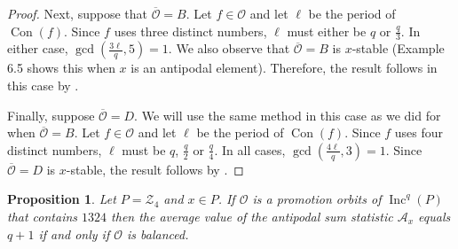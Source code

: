 \documentclass[11pt]{amsart}
\newtheorem{proposition}[theorem]{Proposition}
\theoremstyle{definition}
\newcommand{\as}{\mathcal{A}}
\DeclareMathOperator{\Inc}{\mathrm{Inc}}
\DeclareMathOperator{\Con}{\mathrm{Con}}
\newcommand{\calZ}{\mathcal{Z}}
\begin{document}
\begin{proof}
Next, suppose that $\overline{\mathcal{O}}=B$. Let $f \in \mathcal{O}$ and let $\ell$ be the period of $\Con(f)$. Since $f$ uses three distinct numbers, $\ell$ must either be $q$ or $\frac{q}{3}$.  In either case, $\gcd(\frac{3\ell}{q},5) = 1$. We also observe that $\overline{\mathcal{O}} = B$ is $x$-stable (Example 6.5 shows this when $x$ is an antipodal element). Therefore, the result follows in this case by .

Finally, suppose $\overline{\mathcal{O}}=D$. We will use the same method in this case as we did for when $\overline{\mathcal{O}}=B$.  Let $f \in \mathcal{O}$ and let $\ell$ be the period of $\Con(f)$. Since $f$ uses four distinct numbers, $\ell$ must be $q$, $\frac{q}{2}$ or $\frac{q}{4}$.  In all cases, $\gcd(\frac{4\ell}{q},3) = 1$. Since $\overline{\mathcal{O}} = D$ is $x$-stable, the result follows by .
\end{proof}


\begin{proposition}\label{prop:near-homomesy-C}
    Let $P=\calZ_4$ and $x\in P$. If $\mathcal{O}$ is a promotion  orbits of $\Inc^q(P)$ that contains $1324$ then the average value of the antipodal sum statistic $\as_x$ equals $q+1$ if and only if $\mathcal{O}$ is balanced.
\end{proposition}
\end{document}
